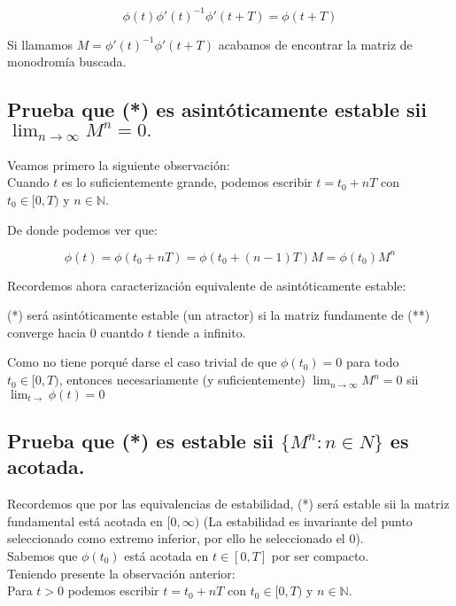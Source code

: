\documentclass[a4paper , 14pt, spanish ]{article}
\begin{document}
$$\phi(t) {\phi'(t)}^{-1}    \phi'(t+T) =   \phi(t+T)$$

Si llamamos $M =  {\phi'(t)}^{-1}    \phi'(t+T)$ acabamos de encontrar la matriz de monodromía buscada. 





\subsection{ Prueba que (*) es asintóticamente estable sii $\lim_{ n \longrightarrow \infty} M^n = 0.$}


Veamos primero la siguiente observación: \\
Cuando $t$ es lo suficientemente grande, podemos escribir $t = t_0+ nT$ con $t_0 \in [0, T)$ y $n \in \mathbb N.$

De donde podemos ver que:

$$\phi(t) =  \phi(t_0 + nT) = \phi(t_0 + (n-1)T) M = \phi(t_0) M^n$$

Recordemos ahora caracterización equivalente de asintóticamente estable:

(*) será asintóticamente estable (un atractor) si la matriz fundamente de (**) converge hacia 0 cuantdo $t$ tiende a infinito.

Como no tiene porqué darse el caso trivial de que  $\phi(t_0) = 0$ para todo $t_0 \in [0, T)$,  entonces necesariamente (y suficientemente)   $\lim_{ n \longrightarrow \infty} M^n = 0$ sii $\lim_{t \longrightarrow}\phi(t) = 0$

 

\subsection { Prueba que (*) es estable sii $\{ M^n : n \in N \}$ es acotada.}

Recordemos que por las equivalencias de estabilidad,  (*) será estable sii la matriz fundamental está acotada en $[0, \infty)$
  (La estabilidad  es invariante del punto seleccionado como extremo inferior, por ello he seleccionado el 0).   \\


Sabemos que  $\phi(t_0)$ está acotada en $t \in [0, T]$ por ser compacto. \\

Teniendo presente la observación anterior: \\

Para $t> 0$  podemos escribir  $t = t_0+ nT$ con $t_0 \in [0, T)$ y $n \in \mathbb N.$
\end{document}
